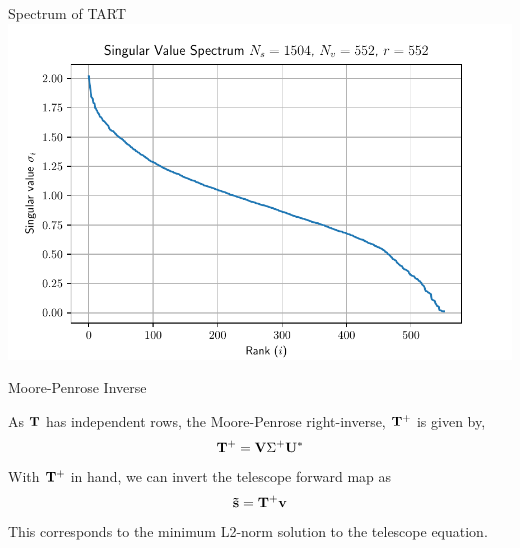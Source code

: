 \documentclass[ignorenonframetext]{beamer}
\begin{document}
\begin{frame}{Spectrum of TART}
  \includegraphics[width=\linewidth]{fig/TART_Singular_Ns_1504_Nv_552.pdf}
\end{frame}

% 

\begin{frame}{Moore-Penrose Inverse}
 
As $\mathbf{T}$ has independent rows, the Moore-Penrose right-inverse, $\mathbf{T}^+$ is given by,
\[ \mathbf{T}^+ = \mathbf{V} \Sigma^+ \mathbf{U}^{*} \]
With $\mathbf{T}^+$ in hand, we can invert the telescope forward map as 
\[ \mathbf{\vec{s}} = \mathbf{T}^+ \mathbf{v} \]
This corresponds to the minimum L2-norm solution to the telescope equation.
\end{frame}
\end{document}
